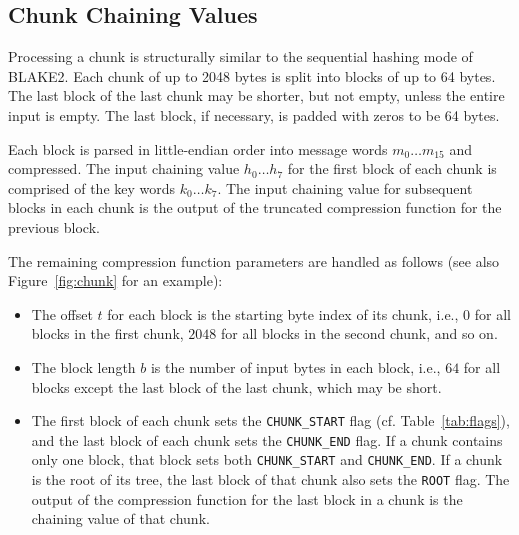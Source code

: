 \documentclass[11pt,notitlepage,a4paper]{article}
\begin{document}
\subsection{Chunk Chaining Values}\label{sec:chunk}

Processing a chunk is structurally similar to the sequential hashing mode of BLAKE2. Each chunk of up to 2048 bytes is split into blocks of up to 64 bytes.
The last block of the last chunk may be shorter, but not empty, unless the
entire input is empty. The last block, if necessary, is padded with zeros to be 64
bytes. 

Each block is parsed in little-endian order into message words $m_{0}
\ldots m_{15}$ and compressed. The input chaining value $h_{0} \ldots h_{7}$
for the first block of each chunk is comprised of the key words $k_{0} \ldots k_{7}$. The
input chaining value for subsequent blocks in each chunk is the output of the truncated
compression function for the previous block. 

The remaining compression function parameters are handled as follows (see also Figure~\ref{fig:chunk} for an example):
\begin{itemize}
\item The offset $t$ for each block is
the starting byte index of its chunk, i.e., $0$ for all blocks in the first chunk, $2048$
for all blocks in the second chunk, and so on. 
\item The block length $b$ is the
number of input bytes in each block, i.e., $64$ for all blocks except the last block of
the last chunk, which may be short. 
\item The first block of each chunk sets the
\texttt{CHUNK\_START} flag (cf. Table~\ref{tab:flags}), and the last block of each chunk sets the
\texttt{CHUNK\_END} flag. If a chunk contains only one block, that block sets
both \texttt{CHUNK\_START} and \texttt{CHUNK\_END}. If a chunk is the root of
its tree, the last block of that chunk also sets the \texttt{ROOT} flag. The
output of the compression function for the last block in a chunk is the
chaining value of that chunk.
\end{itemize}
\end{document}
